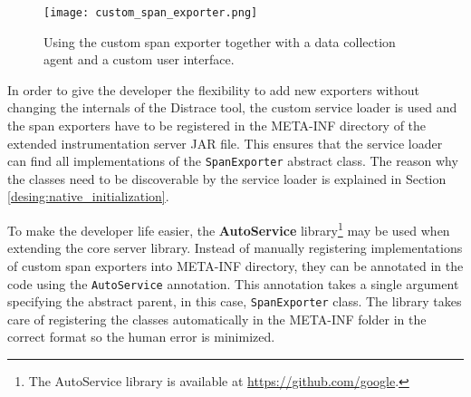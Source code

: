 \begin{figure}
	\centering
	\texttt{[image: custom\_span\_exporter.png]}
	\caption{Using the custom span exporter together with a data collection agent and a custom user interface.}
	\label{fig:custom_span_exporter}
\end{figure}

In order to give the developer the flexibility to add new exporters without changing the internals of the Distrace tool, the custom service loader is used and the span exporters have to be registered in the META-INF directory of the extended instrumentation server JAR file. This ensures that the service loader can find all implementations of the \texttt{SpanExporter} abstract class. The reason why the classes need to be discoverable by the service loader is explained in Section \ref{desing:native_initialization}.

To make the developer life easier, the \textbf{AutoService} library\footnote{The AutoService library is available at \url{https://github.com/google}.} may be used when extending the core server library. Instead of manually registering implementations of custom span exporters into META-INF directory, they can be annotated in the code using the \texttt{AutoService} annotation. This annotation takes a single argument specifying the abstract parent, in this case, \texttt{SpanExporter} class. The library takes care of registering the classes automatically in the META-INF folder in the correct format so the human error is minimized.


